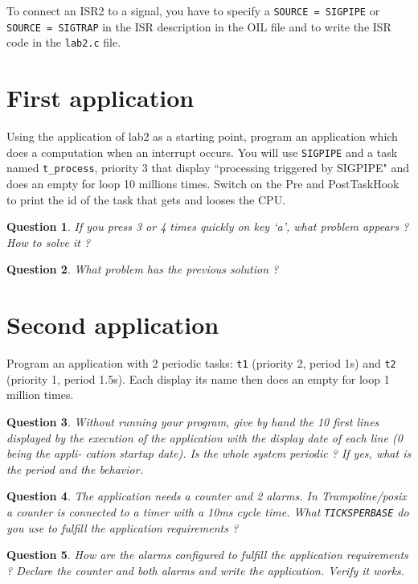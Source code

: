 \documentclass[11pt]{article}
\newtheorem{ex}{Question}
\begin{document}
To connect an ISR2 to a signal, you have to specify a \texttt{SOURCE = SIGPIPE} or \texttt{SOURCE = SIGTRAP} in the ISR description in the OIL file and to write the ISR code in the \texttt{lab2.c} file.

\section{First application}

Using the application of lab2 as a starting point, program an application which does a computation when an interrupt occurs. You will use \texttt{SIGPIPE} and a task named \texttt{t_process}, priority 3 that display ``processing triggered by SIGPIPE" and does an empty for loop 10 millions times. Switch on the Pre and PostTaskHook to print the id of the task that gets and looses the CPU.

\begin{ex}
If you press 3 or 4 times quickly on key `a', what problem appears ? How to solve it ?
\end{ex}
\begin{ex}
What problem has the previous solution ?
\end{ex}

\section{Second application}

Program an application with 2 periodic tasks: \texttt{t1} (priority 2, period 1s) and \texttt{t2} (priority 1, period 1.5s). Each display its name then does an empty for loop 1 million times.

\begin{ex}
Without running your program, give by hand the 10 first lines displayed by the execution of the application with the display date of each line (0 being the appli- cation startup date). Is the whole system periodic ? If yes, what is the period and the behavior.
\end{ex}

\begin{ex}
The application needs a counter and 2 alarms. In Trampoline/posix a counter is connected to a timer with a 10ms cycle time. What \texttt{TICKSPERBASE} do you use to fulfill the application requirements ?
\end{ex}

\begin{ex}
How are the alarms configured to fulfill the application requirements ? Declare the counter and both alarms and write the application. Verify it works.
\end{ex}
\end{document}
